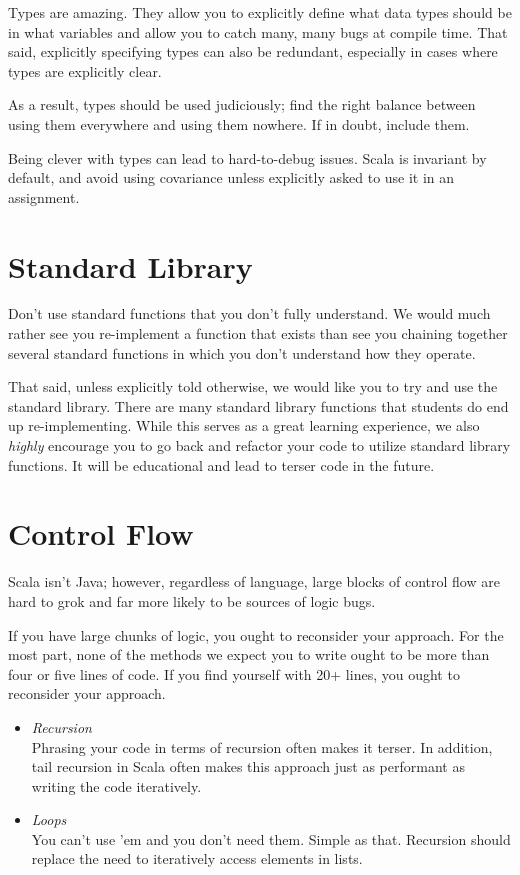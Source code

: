 Types are amazing. They allow you to explicitly define what data types should be in
what variables and allow you to catch many, many bugs at compile time. That said,
explicitly specifying types can also be redundant, especially in cases where types
are explicitly clear.
\par
As a result, types should be used judiciously; find the right balance between using
them everywhere and using them nowhere. If in doubt, include them.
\par
Being clever with types can lead to hard-to-debug issues. Scala is invariant by
default, and avoid using covariance unless explicitly asked to use it in an
assignment.

\section{Standard Library}

Don't use standard functions that you don't fully understand. We would much rather
see you re-implement a function that exists than see you chaining together several
standard functions in which you don't understand how they operate.
\par
That said, unless explicitly told otherwise, we would like you to try and use
the standard library. There are many standard library functions that students do end
up re-implementing. While this serves as a great learning experience, we also
\textit{highly} encourage you to go back and refactor your code to utilize standard
library functions. It will be educational and lead to terser code in the future.

\section{Control Flow}

Scala isn't Java; however, regardless of language, large blocks of control flow
are hard to grok and far more likely to be sources of logic bugs.
\par
If you have large chunks of logic, you ought to reconsider your approach. For the
most part, none of the methods we expect you to write ought to be more than four
or five lines of code. If you find yourself with 20+ lines, you ought to reconsider
your approach.
	\begin{itemize}
		\item \textit{Recursion}\\
		  Phrasing your code in terms of recursion often makes it terser. In addition,
      tail recursion in Scala often makes this approach just as performant as
      writing the code iteratively.
		\item \textit{Loops}\\
		  You can't use 'em and you don't need them. Simple as that. Recursion should
      replace the need to iteratively access elements in lists.
	\end{itemize}

